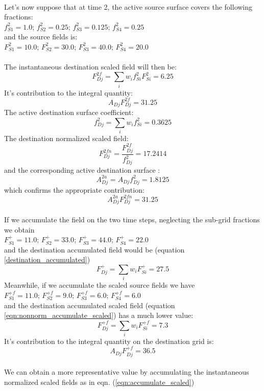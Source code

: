 \\
Let's now suppose that at time 2, the active source surface covers the following fractions:\\
\(f^{2}_{S1} = 1.0\);
\(f^{2}_{S2} = 0.25\);
\(f^{2}_{S3} = 0.125\);
\(f^{2}_{S4} = 0.25\)\\
and the source fields is:\\
\(F^{2}_{S1} = 10.0\);
\(F^{2}_{S2} = 30.0\);
\(F^{2}_{S3} = 40.0\);
\(F^{2}_{S4} = 20.0\)\\
\\
The instantaneous destination scaled field will then be:
\[F^{2f}_{Dj} = \sum_iw_{i}f^2_{Si}F^2_{Si} = 6.25\]
It's contribution to the integral quantity:
\[A_{Dj}F^{2f}_{Dj} = 31.25\]
The active destination surface coefficient:
\[f^2_{Dj} = \sum_i{w_{i}f^2_{Si} = 0.3625}\]
The destination normalized scaled field:
\[F^{2fn}_{Dj} = \frac{F^{2f}_{Dj}}{f^2_{Dj}} = 17.2414\]
and the corresponding active destination surface :
\[A^{2a}_{Dj} = A_{Dj}f^2_{Dj} = 1.8125\]
which confirms the appropriate contribution:
\[A^{2a}_{Dj}F^{2fn}_{Dj} = 31.25\]
\\
If we accumulate the field on the two time steps, neglecting the sub-grid fractions we obtain\\
\(F^{+}_{S1} = 11.0\);
\(F^{+}_{S2} = 33.0\);
\(F^{+}_{S3} = 44.0\);
\(F^{+}_{S4} = 22.0\)\\
and the destination accumulated field would be (equation \ref{destination_accumulated})
\[F^{+}_{Dj}=\sum_i{w_iF^{+}_{Si}}=27.5\]
Meanwhile, if we accumulate the scaled source fields we have\\
\(F^{+f}_{S1} = 11.0\);
\(F^{+f}_{S2} = 9.0\);
\(F^{+f}_{S3} = 6.0\);
\(F^{+f}_{S4} = 6.0\)\\
and the destination accumulated scaled field (equation \ref{eqn:nonnorm_accumulate_scaled}) has a much lower value:
\[F^{+f}_{Dj}=\sum_i{w_iF^{+f}_{Si}}=7.3\]
It's contribution to the integral quantity on the destination grid is:
\[A_{Dj}F^{+f}_{Dj} = 36.5\]
\\
We can obtain a more representative value by accumulating the instantaneous normalized scaled fields as in eqn. (\ref{eqn:accumulate_scaled})
